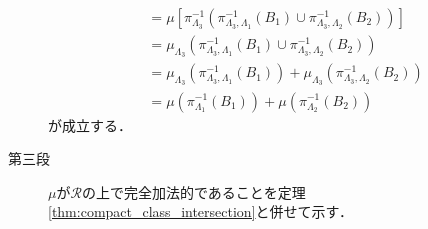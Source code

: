 \begin{prf}
\begin{description}
\begin{align}
					&= \mu\left[ \pi_{\Lambda_3}^{-1}\left( \pi_{\Lambda_3,\Lambda_1}^{-1}(B_1) \cup \pi_{\Lambda_3,\Lambda_2}^{-1}(B_2) \right) \right] \\
					&= \mu_{\Lambda_3} \left( \pi_{\Lambda_3,\Lambda_1}^{-1}(B_1) \cup \pi_{\Lambda_3,\Lambda_2}^{-1}(B_2) \right) \\
					&= \mu_{\Lambda_3} \left( \pi_{\Lambda_3,\Lambda_1}^{-1}(B_1) \right)
						+ \mu_{\Lambda_3} \left( \pi_{\Lambda_3,\Lambda_2}^{-1}(B_2) \right) \\
					&= \mu\left( \pi_{\Lambda_1}^{-1}(B_1) \right)
						+ \mu\left( \pi_{\Lambda_2}^{-1}(B_2) \right)
				\end{align}
				が成立する．
			
			\item[第三段]
				$\mu$が$\mathscr{R}$の上で完全加法的であることを定理\ref{thm:compact_class_intersection}と併せて示す．
		\end{description}
	\end{prf}